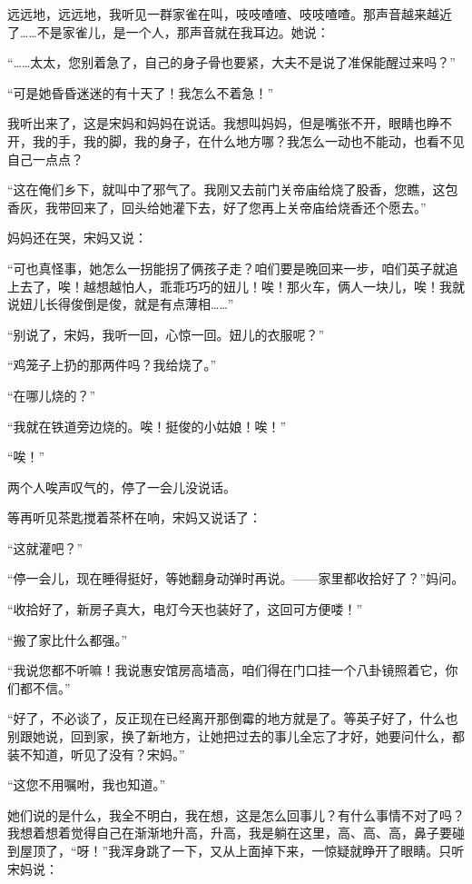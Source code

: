 \par 远远地，远远地，我听见一群家雀在叫，吱吱喳喳、吱吱喳喳。那声音越来越近了……不是家雀儿，是一个人，那声音就在我耳边。她说：
\par “……太太，您别着急了，自己的身子骨也要紧，大夫不是说了准保能醒过来吗？”
\par “可是她昏昏迷迷的有十天了！我怎么不着急！”
\par 我听出来了，这是宋妈和妈妈在说话。我想叫妈妈，但是嘴张不开，眼睛也睁不开，我的手，我的脚，我的身子，在什么地方哪？我怎么一动也不能动，也看不见自己一点点？
\par “这在俺们乡下，就叫中了邪气了。我刚又去前门关帝庙给烧了股香，您瞧，这包香灰，我带回来了，回头给她灌下去，好了您再上关帝庙给烧香还个愿去。”
\par 妈妈还在哭，宋妈又说：
\par “可也真怪事，她怎么一拐能拐了俩孩子走？咱们要是晚回来一步，咱们英子就追上去了，唉！越想越怕人，乖乖巧巧的妞儿！唉！那火车，俩人一块儿，唉！我就说妞儿长得俊倒是俊，就是有点薄相……”
\par “别说了，宋妈，我听一回，心惊一回。妞儿的衣服呢？”
\par “鸡笼子上扔的那两件吗？我给烧了。”
\par “在哪儿烧的？”
\par “我就在铁道旁边烧的。唉！挺俊的小姑娘！唉！”
\par “唉！”
\par 两个人唉声叹气的，停了一会儿没说话。
\par 等再听见茶匙搅着茶杯在响，宋妈又说话了：
\par “这就灌吧？”
\par “停一会儿，现在睡得挺好，等她翻身动弹时再说。——家里都收拾好了？”妈问。
\par “收拾好了，新房子真大，电灯今天也装好了，这回可方便喽！”
\par “搬了家比什么都强。”
\par “我说您都不听嘛！我说惠安馆房高墙高，咱们得在门口挂一个八卦镜照着它，你们都不信。”
\par “好了，不必谈了，反正现在已经离开那倒霉的地方就是了。等英子好了，什么也别跟她说，回到家，换了新地方，让她把过去的事儿全忘了才好，她要问什么，都装不知道，听见了没有？宋妈。”
\par “这您不用嘱咐，我也知道。”
\par 她们说的是什么，我全不明白，我在想，这是怎么回事儿？有什么事情不对了吗？我想着想着觉得自己在渐渐地升高，升高，我是躺在这里，高、高、高，鼻子要碰到屋顶了，“呀！”我浑身跳了一下，又从上面掉下来，一惊疑就睁开了眼睛。只听宋妈说：
